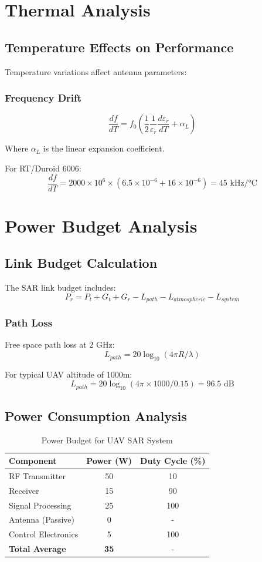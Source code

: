 \documentclass[12pt]{article}
\begin{document}
\section{Thermal Analysis}

\subsection{Temperature Effects on Performance}

Temperature variations affect antenna parameters:

\subsubsection{Frequency Drift}
\[\frac{df}{dT} = f_0 \left(\frac{1}{2}\frac{1}{\varepsilon_r}\frac{d\varepsilon_r}{dT} + \alpha_L\right)\]

Where $\alpha_L$ is the linear expansion coefficient.

For RT/Duroid 6006:
\[\frac{df}{dT} = 2000 \times 10^6 \times (6.5 \times 10^{-6} + 16 \times 10^{-6}) = 45 \text{ kHz/°C}\]


\section{Power Budget Analysis}

\subsection{Link Budget Calculation}

The SAR link budget includes:
\[P_r = P_t + G_t + G_r - L_{path} - L_{atmospheric} - L_{system}\]

\subsubsection{Path Loss}
Free space path loss at 2 GHz:
\[L_{path} = 20\log_{10}(4\pi R/\lambda)\]

For typical UAV altitude of 1000m:
\[L_{path} = 20\log_{10}(4\pi \times 1000/0.15) = 96.5 \text{ dB}\]

\subsection{Power Consumption Analysis}

\begin{table}[H]
\centering
\caption{Power Budget for UAV SAR System}
\begin{tabular}{|l|c|c|}
\hline
\textbf{Component} & \textbf{Power (W)} & \textbf{Duty Cycle (\%)} \\
\hline
RF Transmitter & 50 & 10 \\
Receiver & 15 & 90 \\
Signal Processing & 25 & 100 \\
Antenna (Passive) & 0 & - \\
Control Electronics & 5 & 100 \\
\hline
\textbf{Total Average} & \textbf{35} & - \\
\hline
\end{tabular}
\end{table}
\end{document}
